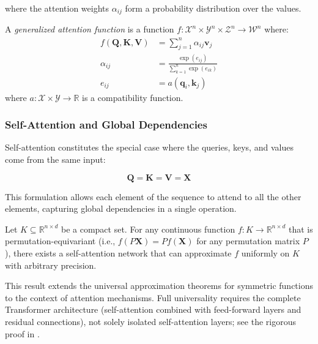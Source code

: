 where the attention weights $\alpha_{ij}$ form a probability distribution over the values.

\begin{definition}\label{def:generalized_attention}
    A \textit{generalized attention function} is a function $f: \mathcal{X}^n \times \mathcal{Y}^n \times \mathcal{Z}^n \to \mathcal{W}^n$ where:
    \begin{align}
        f(\mathbf{Q}, \mathbf{K}, \mathbf{V}) &= \sum_{j=1}^{n} \alpha_{ij} \mathbf{v}_j \\
        \alpha_{ij} &= \frac{\exp(e_{ij})}{\sum_{k=1}^{n} \exp(e_{ik})} \\
        e_{ij} &= a(\mathbf{q}_i, \mathbf{k}_j)
    \end{align}
    where $a: \mathcal{X} \times \mathcal{Y} \to \mathbb{R}$ is a compatibility function.
\end{definition}

\subsubsection{Self-Attention and Global Dependencies}

Self-attention constitutes the special case where the queries, keys, and values come from the same input:

\begin{equation}
    \mathbf{Q} = \mathbf{K} = \mathbf{V} = \mathbf{X}
    \label{eq:self_attention_case}
\end{equation}

This formulation allows each element of the sequence to attend to all the other elements, capturing global dependencies in a single operation.

\begin{theorem}\label{theorem:self_attention_universality}
    Let $K \subseteq \mathbb{R}^{n \times d}$ be a compact set. For any continuous function
    $f: K \to \mathbb{R}^{n \times d}$ that is permutation-equivariant (i.e., $f(P\mathbf{X}) = Pf(\mathbf{X})$
    for any permutation matrix $P$), there exists a self-attention network that can approximate
    $f$ uniformly on $K$ with arbitrary precision.

    This result extends the universal approximation theorems for symmetric functions
    \citep{zaheer2017deepsets} to the context of attention mechanisms. Full universality requires the complete Transformer architecture (self-attention combined with feed-forward layers and residual connections), not solely isolated self-attention layers; see the rigorous proof in \citet{yun2020transformers}.
\end{theorem}

